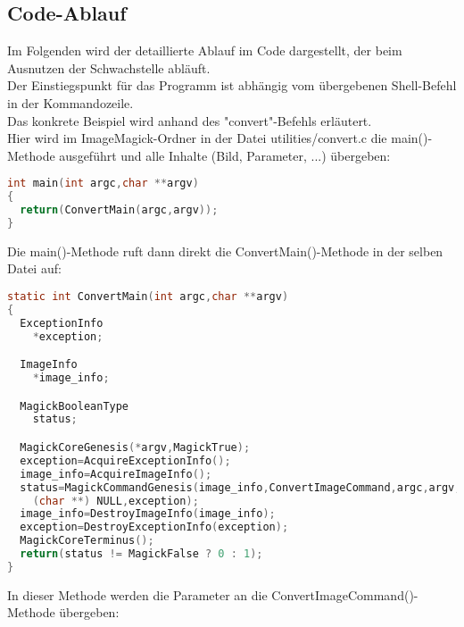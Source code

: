\subsection{Code-Ablauf}\label{subsec:code-ablauf}

Im Folgenden wird der detaillierte Ablauf im Code dargestellt, der beim Ausnutzen der Schwachstelle abläuft.\\

Der Einstiegspunkt für das Programm ist abhängig vom übergebenen Shell-Befehl in der Kommandozeile.\\

Das konkrete Beispiel wird anhand des "convert"-Befehls erläutert.\\

Hier wird im ImageMagick-Ordner in der Datei utilities/convert.c die main()-Methode ausgeführt und alle Inhalte (Bild, Parameter, ...) übergeben:\\

\begin{lstlisting}[firstnumber=90, language=C, caption=utilities/convert.c Einstieg main(),label={lst:lstlisting}]
int main(int argc,char **argv)
{
  return(ConvertMain(argc,argv));
}
\end{lstlisting}
\vspace{5mm}

Die main()-Methode ruft dann direkt die ConvertMain()-Methode in der selben Datei auf:\\

\begin{lstlisting}[firstnumber=67, language=C, caption=utilities/convert.c ConvertMain(),label={lst:lstlisting}]
static int ConvertMain(int argc,char **argv)
{
  ExceptionInfo
    *exception;

  ImageInfo
    *image_info;

  MagickBooleanType
    status;

  MagickCoreGenesis(*argv,MagickTrue);
  exception=AcquireExceptionInfo();
  image_info=AcquireImageInfo();
  status=MagickCommandGenesis(image_info,ConvertImageCommand,argc,argv,
    (char **) NULL,exception);
  image_info=DestroyImageInfo(image_info);
  exception=DestroyExceptionInfo(exception);
  MagickCoreTerminus();
  return(status != MagickFalse ? 0 : 1);
}
\end{lstlisting}
\vspace{5mm}

In dieser Methode werden die Parameter an die ConvertImageCommand()-Methode übergeben:\\

